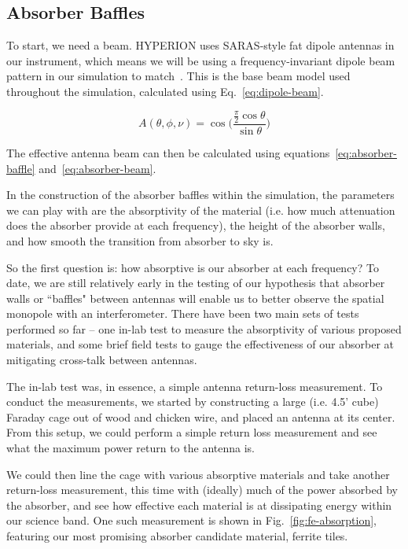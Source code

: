 \subsection{Absorber Baffles}

To start, we need a beam. HYPERION uses SARAS-style fat dipole antennas in our 
instrument, which means we will be using a frequency-invariant dipole beam 
pattern in our simulation to match~\citep{patra2013}. This is the base beam 
model used throughout the simulation, calculated using 
Eq.~\eqref{eq:dipole-beam}.

\begin{equation}
    \label{eq:dipole-beam}
    A(\theta, \phi, \nu) = \cos\Big(\frac{\frac{\pi}{2} 
    \cos{\theta}}{\sin{\theta}}\Big)
\end{equation}

The effective antenna beam can then be calculated using 
equations~\eqref{eq:absorber-baffle} and~\eqref{eq:absorber-beam}.

In the construction of the absorber baffles within the simulation, the 
parameters we can play with are the absorptivity of the material (i.e.  how 
much attenuation does the absorber provide at each frequency), the height of 
the absorber walls, and how smooth the transition from absorber to sky is.  

So the first question is: how absorptive is our absorber at each frequency? To 
date, we are still relatively early in the testing of our hypothesis that 
absorber walls or ``baffles" between antennas will enable us to better observe 
the spatial monopole with an interferometer.  There have been two main sets of 
tests performed so far -- one in-lab test to measure the absorptivity of 
various proposed materials, and some brief field tests to gauge the 
effectiveness of our absorber at mitigating cross-talk between antennas.

The in-lab test was, in essence, a simple antenna return-loss measurement. To 
conduct the measurements, we started by constructing a large (i.e. 4.5' cube) 
Faraday cage out of wood and chicken wire, and placed an antenna at its center.  
From this setup, we could perform a simple return loss measurement and see what 
the maximum power return to the antenna is.

We could then line the cage with various absorptive materials and take another 
return-loss measurement, this time with (ideally) much of the power absorbed by 
the absorber, and see how effective each material is at dissipating energy 
within our science band. One such measurement is shown in 
Fig.~\ref{fig:fe-absorption}, featuring our most promising absorber candidate 
material, ferrite tiles.

